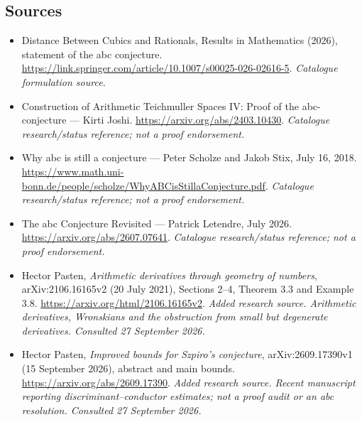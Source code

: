 \documentclass[11pt,a4paper]{article}
\begin{document}
\subsection{Sources}
\begin{itemize}\raggedright
\item[\textnormal{[S1]}]\hypertarget{source:13:1}{} Distance Between Cubics and Rationals, Results in Mathematics (2026), statement of the abc conjecture.
\url{https://link.springer.com/article/10.1007/s00025-026-02616-5}.
{\small\textit{Catalogue formulation source.}}
\item[\textnormal{[S2]}]\hypertarget{source:13:2}{} Construction of Arithmetic Teichmuller Spaces IV: Proof of the abc-conjecture — Kirti Joshi.
\url{https://arxiv.org/abs/2403.10430}.
{\small\textit{Catalogue research/status reference; not a proof endorsement.}}
\item[\textnormal{[S3]}]\hypertarget{source:13:3}{} Why abc is still a conjecture — Peter Scholze and Jakob Stix, July 16, 2018.
\url{https://www.math.uni-bonn.de/people/scholze/WhyABCisStillaConjecture.pdf}.
{\small\textit{Catalogue research/status reference; not a proof endorsement.}}
\item[\textnormal{[S4]}]\hypertarget{source:13:4}{} The abc Conjecture Revisited — Patrick Letendre, July 2026.
\url{https://arxiv.org/abs/2607.07641}.
{\small\textit{Catalogue research/status reference; not a proof endorsement.}}
\item[\textnormal{[E1]}]\hypertarget{extra:13:1}{} Hector Pasten, \emph{Arithmetic derivatives through geometry of numbers}, arXiv:2106.16165v2 (20 July 2021), Sections 2--4, Theorem 3.3 and Example 3.8.
\url{https://arxiv.org/html/2106.16165v2}.
{\small\textit{Added research source. Arithmetic derivatives, Wronskians and the obstruction from small but degenerate derivatives. Consulted 27 September 2026.}}
\item[\textnormal{[E2]}]\hypertarget{extra:13:2}{} Hector Pasten, \emph{Improved bounds for Szpiro's conjecture}, arXiv:2609.17390v1 (15 September 2026), abstract and main bounds.
\url{https://arxiv.org/abs/2609.17390}.
{\small\textit{Added research source. Recent manuscript reporting discriminant--conductor estimates; not a proof audit or an abc resolution. Consulted 27 September 2026.}}
\end{itemize}

\end{document}
